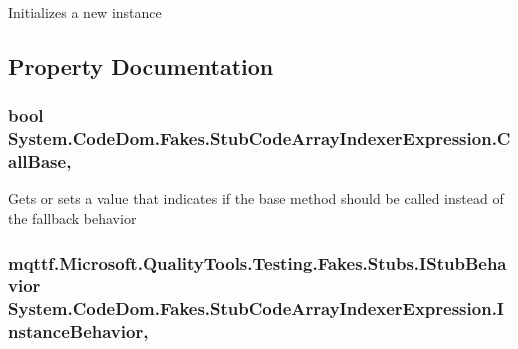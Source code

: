 Initializes a new instance



\subsection{Property Documentation}
\hypertarget{class_system_1_1_code_dom_1_1_fakes_1_1_stub_code_array_indexer_expression_a48eeedc3169c5859cc087eb31f136bf5}{
\subsubsection[{Call\-Base}]{\setlength{\rightskip}{0pt plus 5cm}bool System.\-Code\-Dom.\-Fakes.\-Stub\-Code\-Array\-Indexer\-Expression.\-Call\-Base\hspace{0.3cm}{\ttfamily [get]}, {\ttfamily [set]}}}\label{class_system_1_1_code_dom_1_1_fakes_1_1_stub_code_array_indexer_expression_a48eeedc3169c5859cc087eb31f136bf5}


Gets or sets a value that indicates if the base method should be called instead of the fallback behavior

\hypertarget{class_system_1_1_code_dom_1_1_fakes_1_1_stub_code_array_indexer_expression_a732404d56c897ece5e66b736aa1d6cd9}{
\subsubsection[{Instance\-Behavior}]{\setlength{\rightskip}{0pt plus 5cm}mqttf.\-Microsoft.\-Quality\-Tools.\-Testing.\-Fakes.\-Stubs.\-I\-Stub\-Behavior System.\-Code\-Dom.\-Fakes.\-Stub\-Code\-Array\-Indexer\-Expression.\-Instance\-Behavior\hspace{0.3cm}{\ttfamily [get]}, {\ttfamily [set]}}}\label{class_system_1_1_code_dom_1_1_fakes_1_1_stub_code_array_indexer_expression_a732404d56c897ece5e66b736aa1d6cd9}


